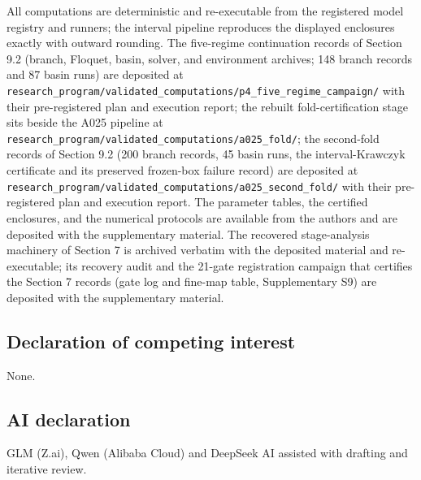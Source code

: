 \documentclass[11pt]{article}
\begin{document}
All computations are deterministic and re-executable from the registered
model registry and runners; the interval pipeline reproduces the
displayed enclosures exactly with outward rounding. The five-regime
continuation records of Section 9.2 (branch, Floquet, basin, solver, and
environment archives; 148 branch records and 87 basin runs) are
deposited at
\texttt{research\_program/validated\_computations/p4\_five\_regime\_campaign/}
with their pre-registered plan and execution report; the rebuilt
fold-certification stage sits beside the A025 pipeline at
\texttt{research\_program/validated\_computations/a025\_fold/}; the
second-fold records of Section 9.2 (200 branch records, 45 basin runs,
the interval-Krawczyk certificate and its preserved frozen-box failure
record) are deposited at
\texttt{research\_program/validated\_computations/a025\_second\_fold/}
with their pre-registered plan and execution report. The parameter
tables, the certified enclosures, and the numerical protocols are
available from the authors and are deposited with the supplementary
material. The recovered stage-analysis machinery of Section 7 is
archived verbatim with the deposited material and re-executable; its
recovery audit and the 21-gate registration campaign that certifies the
Section 7 records (gate log and fine-map table, Supplementary S9) are
deposited with the supplementary material.

\subsection*{Declaration of competing interest}

None.

\subsection*{AI declaration}
GLM (Z.ai), Qwen (Alibaba Cloud) and DeepSeek AI assisted with drafting and iterative review.
\end{document}
